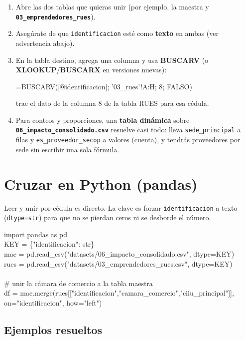 \documentclass[11pt,letterpaper]{article}
\newcommand{\col}[1]{\texttt{\small #1}}
\newcommand{\file}[1]{{\small\textbf{\texttt{#1}}}}
\begin{document}
\begin{enumerate}[leftmargin=1.5em]
\item Abre las dos tablas que quieras unir (por ejemplo, la maestra y \file{03\_emprendedores\_rues}).
\item Asegúrate de que \col{identificacion} esté como \textbf{texto} en ambas (ver advertencia abajo).
\item En la tabla destino, agrega una columna y usa \textbf{BUSCARV} (o \textbf{XLOOKUP}/\textbf{BUSCARX} en versiones nuevas):
\begin{code}\ttfamily\small
=BUSCARV([@identificacion]; '03\_rues'!A:H; 8; FALSO)
\end{code}
trae el dato de la columna 8 de la tabla RUES para esa cédula.
\item Para conteos y proporciones, una \textbf{tabla dinámica} sobre \file{06\_impacto\_consolidado.csv} resuelve casi todo: lleva \col{sede\_principal} a filas y \col{es\_proveedor\_secop} a valores (cuenta), y tendrás proveedores por sede sin escribir una sola fórmula.
\end{enumerate}

\section{Cruzar en Python (pandas)}

Leer y unir por cédula es directo. La clave es forzar \col{identificacion} a texto (\col{dtype=str}) para que no se pierdan ceros ni se desborde el número.

\begin{code}\ttfamily\small
import pandas as pd\\
KEY = \{"identificacion": str\}\\
mae  = pd.read\_csv("datasets/06\_impacto\_consolidado.csv", dtype=KEY)\\
rues = pd.read\_csv("datasets/03\_emprendedores\_rues.csv",  dtype=KEY)\\
\\
\# unir la cámara de comercio a la tabla maestra\\
df = mae.merge(rues[["identificacion","camara\_comercio","ciiu\_principal"]],\\
\hspace*{3.2em}on="identificacion", how="left")
\end{code}

\subsection{Ejemplos resueltos}
\end{document}
